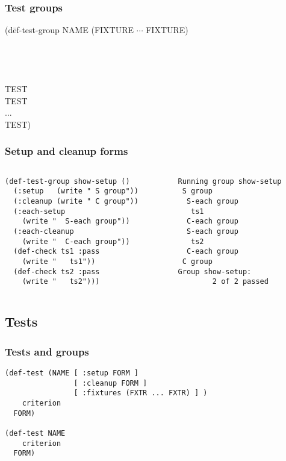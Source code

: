 \documentclass{beamer}
\begin{document}
\begin{frame}
  \frametitle{Test groups}
  {\ttfamily
    \begin{tabbing}
      (d\=ef-test-group NAME (FIXTURE $\cdots$ FIXTURE)
      \\    
      \\    
      \\    
      \\    
      \\    \>TEST
      \\    \>TEST
      \\    \>...
      \\    \>TEST)
    \end{tabbing}}
\end{frame}

\begin{frame}[fragile]
  \frametitle{Setup and cleanup forms}
{\small
  \begin{columns}[T]
    \begin{column}{2.65in}
\begin{verbatim}
(def-test-group show-setup ()
  (:setup   (write " S group"))
  (:cleanup (write " C group"))
  (:each-setup
    (write "  S-each group"))
  (:each-cleanup
    (write "  C-each group"))
  (def-check ts1 :pass
    (write "   ts1"))
  (def-check ts2 :pass
    (write "   ts2")))
\end{verbatim}
    \end{column}
    \begin{column}{2in}
\begin{verbatim}
Running group show-setup
 S group
  S-each group
   ts1
  C-each group
  S-each group
   ts2
  C-each group
 C group
Group show-setup:
        2 of 2 passed
\end{verbatim}
    \end{column}
  \end{columns}
}
\end{frame}

\subsection{Tests}

\begin{frame}[fragile]
  \frametitle{Tests and groups}
\begin{verbatim}
(def-test (NAME [ :setup FORM ]
                [ :cleanup FORM ]
                [ :fixtures (FXTR ... FXTR) ] )
    criterion
  FORM)

(def-test NAME
    criterion
  FORM)
\end{verbatim}
  
\end{frame}
\end{document}
